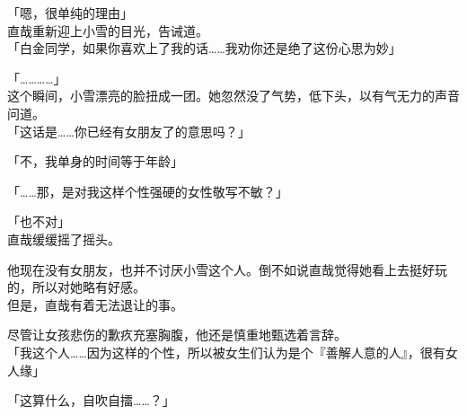「嗯，很单纯的理由」\\

直哉重新迎上小雪的目光，告诫道。\\

「白金同学，如果你喜欢上了我的话……我劝你还是绝了这份心思为妙」

「…………」\\

这个瞬间，小雪漂亮的脸扭成一团。她忽然没了气势，低下头，以有气无力的声音问道。\\

「这话是……你已经有女朋友了的意思吗？」

「不，我单身的时间等于年龄」

「……那，是对我这样个性强硬的女性敬写不敏？」

「也不对」\\

直哉缓缓摇了摇头。

他现在没有女朋友，也并不讨厌小雪这个人。倒不如说直哉觉得她看上去挺好玩的，所以对她略有好感。\\

但是，直哉有着无法退让的事。

尽管让女孩悲伤的歉疚充塞胸腹，他还是慎重地甄选着言辞。\\

「我这个人……因为这样的个性，所以被女生们认为是个『善解人意的人』，很有女人缘」

「这算什么，自吹自擂……？」

